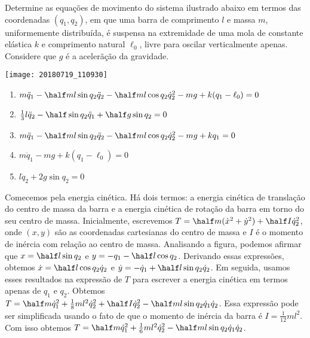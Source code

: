 \begin{question}
    Determine as equações de movimento do sistema ilustrado abaixo em termos das coordenadas $(q_1, q_2)$, em que uma barra de comprimento $l$ e massa $m$, uniformemente distribuída, é suspensa na extremidade de uma mola de constante elástica $k$ e comprimento natural $\ell_0$, livre para oscilar verticalmente apenas.
    Considere que $g$ é a acelerãção da gravidade.

    \begin{center}
      \texttt{[image: 20180719\_110930]}
    \end{center}

    \begin{enumerate}
    	\item $m \ddot q_1 - \half m l \sin q_2 \ddot q_2 - \half m l \cos q_2 \dot q_2^2 - mg + k (q_1 - \ell_0) = 0$ \rightanswer
    	\item $\frac{1}{3} l \ddot q_2 - \half \sin q_2 \ddot q_1 + \half g \sin q_2 = 0$ \rightanswer
    	\item $m \ddot q_1 - \half m l \sin q_2 \ddot q_2 - \half m l \cos q_2 \dot q_2^2 - mg + k q_1 = 0$
    	\item $m \ddot q_1 - mg + k (q_1 - \ell_0) = 0$
    	\item $l \ddot q_2 + 2g \sin q_2 = 0$
    \end{enumerate}

    \begin{solution}
      Comecemos pela energia cinética.
      Há dois termos: a energia cinética de translação do centro de massa da barra e a energia cinética de rotação da barra em torno do seu centro de massa.
      Inicialmente, escrevemos $T = \half m (\dot x^2 + \dot y^2) + \half I \dot q_2^2$, onde $(x,y)$ são as coordenadas cartesianas do centro de massa e $I$ é o momento de inércia com relação ao centro de massa.
      Analisando a figura, podemos afirmar que $x = \half l \sin q_2$ e $y = -q_1 - \half l \cos q_2$.
      Derivando essas expressões, obtemos $\dot x = \half l \cos q_2 \dot q_2$ e $\dot y = -\dot q_1 + \half l \sin q_2 \dot q_2$.
      Em seguida, usamos esses resultados na expressão de $T$ para escrever a energia cinética em termos apenas de $q_1$ e $q_2$.
      Obtemos $T = \half m \dot q_1^2 + \frac{1}{8} m l^2 \dot q_2^2 + \half I \dot q_2^2 - \half m l \sin q_2 \dot q_1 \dot q_2$.
      Essa expressão pode ser simplificada usando o fato de que o momento de inércia da barra é $I = \frac{1}{12}ml^2$.
      Com isso obtemos $T = \half m \dot q_1^2 + \frac{1}{6} m l^2 \dot q_2^2 - \half m l \sin q_2 \dot q_1 \dot q_2$.


\end{solution}
\end{question}
